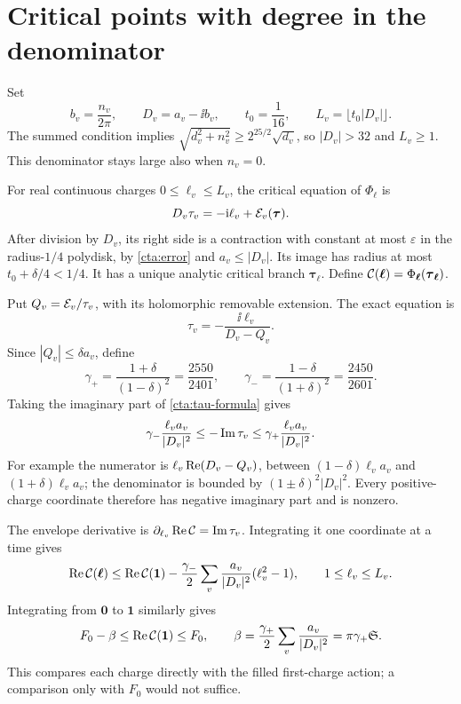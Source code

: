 \section{Critical points with degree in the denominator}
\label{cta:critical}

Set
\begin{equation}\label{cta:D}
 b_v=\frac{n_v}{2\pi},\qquad D_v=a_v-\ii b_v,\qquad
 t_0=\frac1{16},\qquad L_v=\lfloor t_0|D_v|\rfloor .
\end{equation}
The summed condition implies
\(\sqrt{d_v^2+n_v^2}\ge2^{25/2}\sqrt{d_v}\), so
\(|D_v|>32\) and \(L_v\ge1\). This denominator stays large
also when \(n_v=0\).

For real continuous charges \(0\le\ell_v\le L_v\), the critical
equation of \(\Phi_{\boldsymbol\ell}\) is
\begin{equation}\label{cta:fixedpoint}
 D_v\tau_v=-\mathrm i\ell_v+\mathcal E_v(\boldsymbol\tau).
\end{equation}
After division by \(D_v\), its right side is a contraction
with constant at most \(\varepsilon\) in the radius-\(1/4\)
polydisk, by \eqref{cta:error} and \(a_v\le|D_v|\).
Its image has radius at most \(t_0+\delta/4<1/4\).
It has a unique analytic critical branch
\(\boldsymbol\tau_{\boldsymbol\ell}\). Define
\(\mathcal C(\boldsymbol\ell)=
\Phi_{\boldsymbol\ell}(\boldsymbol\tau_{\boldsymbol\ell})\).

Put \(Q_v=\mathcal E_v/\tau_v\), with its holomorphic removable
extension. The exact equation is
\begin{equation}\label{cta:tau-formula}
 \tau_v=-\frac{\ii\ell_v}{D_v-Q_v}.
\end{equation}
Since \(|Q_v|\le\delta a_v\), define
\[
 \gamma_+=\frac{1+\delta}{(1-\delta)^2}
          =\frac{2550}{2401},\qquad
 \gamma_-=\frac{1-\delta}{(1+\delta)^2}
          =\frac{2450}{2601}.
\]
Taking the imaginary part of \eqref{cta:tau-formula} gives
\begin{equation}\label{cta:imaginary}
 \gamma_-\frac{\ell_va_v}{|D_v|^2}
 \le-\operatorname{Im}\tau_v
 \le\gamma_+\frac{\ell_va_v}{|D_v|^2}.
\end{equation}
For example the numerator is
\(\ell_v\operatorname{Re}(D_v-Q_v)\), between
\((1-\delta)\ell_va_v\) and \((1+\delta)\ell_va_v\);
the denominator is bounded by
\((1\pm\delta)^2|D_v|^2\).
Every positive-charge coordinate therefore has negative
imaginary part and is nonzero.

The envelope derivative is
\(\partial_{\ell_v}\operatorname{Re}\mathcal C=\operatorname{Im}\tau_v\).
Integrating it one coordinate at a time gives
\begin{equation}\label{cta:charge-order}
 \operatorname{Re}\mathcal C(\boldsymbol\ell)\le\operatorname{Re}\mathcal C(\mathbf1)
   -\frac{\gamma_-}{2}\sum_v
       \frac{a_v}{|D_v|^2}(\ell_v^2-1),
 \qquad 1\le\ell_v\le L_v .
\end{equation}
Integrating from \(\mathbf0\) to \(\mathbf1\) similarly gives
\begin{equation}\label{cta:drop}
 F_0-\beta\le\operatorname{Re}\mathcal C(\mathbf1)\le F_0,\qquad
 \beta=\frac{\gamma_+}{2}\sum_v\frac{a_v}{|D_v|^2}
                         =\pi\gamma_+\mathfrak S.
\end{equation}
This compares each charge directly with the filled first-charge
action; a comparison only with \(F_0\) would not suffice.

